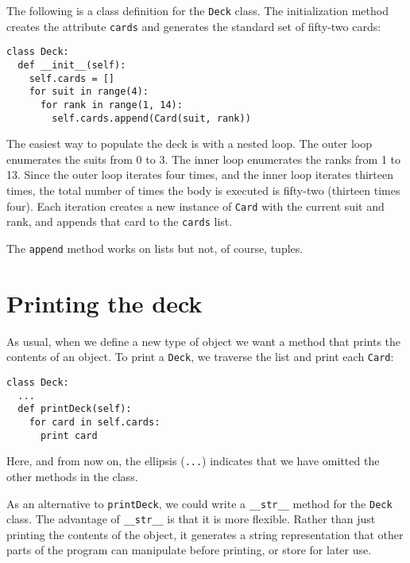 
The following is a class definition for the {\tt Deck} class.  The
initialization method creates the attribute {\tt cards} and generates
the standard set of fifty-two cards:


\beforeverb
\begin{verbatim}
class Deck:
  def __init__(self):
    self.cards = []
    for suit in range(4):
      for rank in range(1, 14):
        self.cards.append(Card(suit, rank))
\end{verbatim}
\afterverb
%
The easiest way to populate the deck is with a nested loop.  The outer
loop enumerates the suits from 0 to 3.  The inner loop enumerates the
ranks from 1 to 13.  Since the outer loop iterates four times, and the
inner loop iterates thirteen times, the total number of times the body
is executed is fifty-two (thirteen times four).  Each iteration
creates a new instance of {\tt Card} with the current suit and rank,
and appends that card to the {\tt cards} list.

The {\tt append} method works on lists but not, of course, tuples.



\section{Printing the deck}
\label{printdeck}


As usual, when we define a new type of object we want a method
that prints the contents of an object.
To print a {\tt Deck}, we traverse the list and print each {\tt Card}:

\beforeverb
\begin{verbatim}
class Deck:
  ...
  def printDeck(self):
    for card in self.cards:
      print card
\end{verbatim}
\afterverb
%
Here, and from now on, the ellipsis ({\tt ...}) indicates that we have
omitted the other methods in the class.

As an alternative to {\tt printDeck}, we could
write a {\tt \_\_str\_\_} method for the {\tt Deck} class.  The
advantage of {\tt \_\_str\_\_} is that it is more flexible.  Rather
than just printing the contents of the object, it generates a string
representation that other parts of the program can manipulate
before printing, or store for later use.


